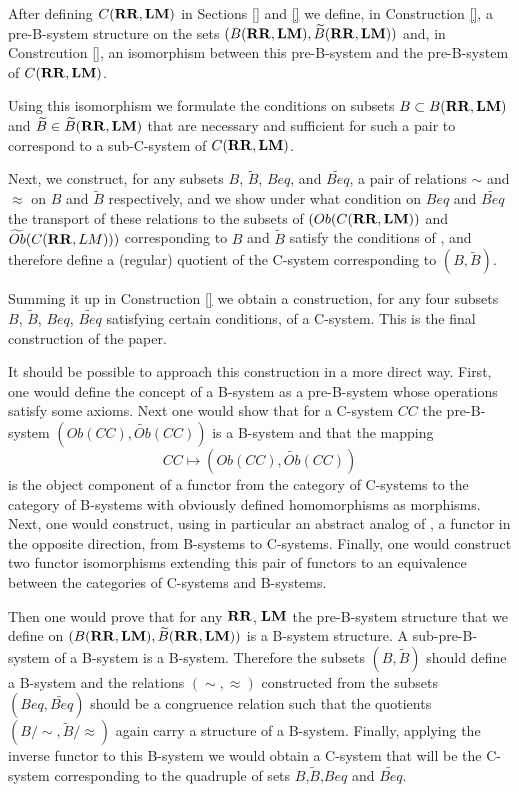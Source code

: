 \documentclass[12pt]{amsart}
\newcommand{\wt}{\widetilde}
\newcommand{\RR}{{\bf RR}}
\newcommand{\LM}{{\bf LM}}
\begin{document}
After defining $C(\RR,\LM)$ in Sections \ref{} and \ref{}
we define, in Construction \ref{}, a pre-B-system structure on the sets
$(B(\RR,\LM),\wt{B}(\RR,\LM))$ and, in Constrcution \ref{}, an isomorphism
between this pre-B-system and the pre-B-system of $C(\RR,\LM)$.

Using this isomorphism we formulate the conditions on subsets $B\subset
B(\RR,\LM)$ and $\wt{B}\in \wt{B}(\RR,\LM)$ that are necessary and sufficient
for such a pair to correspond to a sub-C-system of $C(\RR,\LM)$.

Next, we construct, for any subsets $B$, $\wt{B}$, $Beq$, and $\wt{Beq}$, a pair
of relations $\sim$ and $\approx$ on $B$ and $\wt{B}$ respectively, and we show
under what condition on $Beq$ and $\wt{Beq}$ the transport of these relations to
the subsets of $(Ob(C(\RR,\LM))$ and $\wt{Ob}(C(\RR,LM)))$ corresponding to $B$ and
$\wt{B}$ satisfy the conditions of \cite[Prop. 5.4]{Csubsystems}, and therefore
define a (regular) quotient of the C-system corresponding to $(B,\wt{B})$.

Summing it up in Construction \ref{} we obtain a construction, for any four
subsets $B$, $\wt{B}$, $Beq$, $\wt{Beq}$ satisfying certain conditions, of a
C-system. This is the final construction of the paper.

It should be possible to approach this construction in a more direct
way. First, one would define the concept of a B-system as a pre-B-system whose
operations satisfy some axioms. Next one would show that for a C-system $CC$
the pre-B-system $(Ob(CC),\wt{Ob}(CC))$ is a B-system and that the mapping
%
$$CC\mapsto (Ob(CC),\wt{Ob}(CC))$$
%
is the object component of a functor from the category of C-systems to the
category of B-systems with obviously defined homomorphisms as morphisms. Next,
one would construct, using in particular an abstract analog of
\cite[Def. 2.11]{Hofmann}, a functor in the opposite direction, from B-systems
to C-systems. Finally, one would construct two functor isomorphisms extending
this pair of functors to an equivalence between the categories of C-systems and
B-systems.

Then one would prove that for any $\RR$, $\LM$ the pre-B-system structure that
we define on $(B(\RR,\LM),\wt{B}(\RR,\LM))$ is a B-system structure. A
sub-pre-B-system of a B-system is a B-system. Therefore the subsets
$(B,\wt{B})$ should define a B-system and the relations $(\sim,\approx)$
constructed from the subsets $(Beq,\wt{Beq})$ should be a congruence relation
such that the quotients $(B/{\sim},\wt{B}/\approx)$ again carry a structure of a
B-system. Finally, applying the inverse functor to this B-system we would
obtain a C-system that will be the C-system corresponding to the quadruple of
sets $B$,$\wt{B}$,$Beq$ and $\wt{Beq}$.
\end{document}
